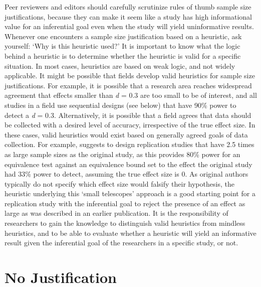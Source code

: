 \documentclass[
]{krantz}
\begin{document}
Peer reviewers and editors should carefully scrutinize rules of thumb sample size justifications, because they can make it seem like a study has high informational value for an inferential goal even when the study will yield uninformative results. Whenever one encounters a sample size justification based on a heuristic, ask yourself: `Why is this heuristic used?' It is important to know what the logic behind a heuristic is to determine whether the heuristic is valid for a specific situation. In most cases, heuristics are based on weak logic, and not widely applicable. It might be possible that fields develop valid heuristics for sample size justifications. For example, it is possible that a research area reaches widespread agreement that effects smaller than \emph{d} = 0.3 are too small to be of interest, and all studies in a field use sequential designs (see below) that have 90\% power to detect a \emph{d} = 0.3. Alternatively, it is possible that a field agrees that data should be collected with a desired level of accuracy, irrespective of the true effect size. In these cases, valid heuristics would exist based on generally agreed goals of data collection. For example, \citet{simonsohn_small_2015} suggests to design replication studies that have 2.5 times as large sample sizes as the original study, as this provides 80\% power for an equivalence test against an equivalence bound set to the effect the original study had 33\% power to detect, assuming the true effect size is 0. As original authors typically do not specify which effect size would falsify their hypothesis, the heuristic underlying this `small telescopes' approach is a good starting point for a replication study with the inferential goal to reject the presence of an effect as large as was described in an earlier publication. It is the responsibility of researchers to gain the knowledge to distinguish valid heuristics from mindless heuristics, and to be able to evaluate whether a heuristic will yield an informative result given the inferential goal of the researchers in a specific study, or not.

\hypertarget{no-justification}{%
\section{No Justification}\label{no-justification}}
\end{document}
